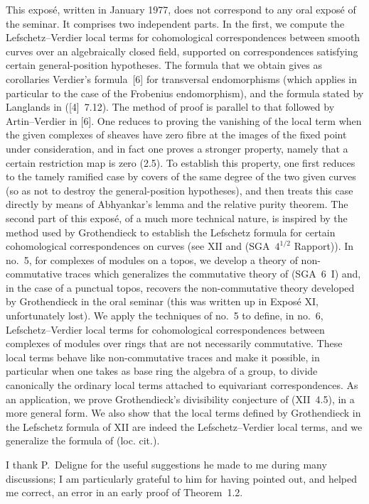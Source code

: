 This exposé, written in January 1977, does not correspond to any oral exposé of the seminar. It comprises two independent parts. In the first, we compute the Lefschetz--Verdier local terms for cohomological correspondences between smooth curves over an algebraically closed field, supported on correspondences satisfying certain general-position hypotheses. The formula that we obtain gives as corollaries Verdier's formula~[6] for transversal endomorphisms (which applies in particular to the case of the Frobenius endomorphism), and the formula stated by Langlands in ([4]~7.12). The method of proof is parallel to that followed by Artin--Verdier in [6]. One reduces to proving the vanishing of the local term when the given complexes of sheaves have zero fibre at the images of the fixed point under consideration, and in fact one proves a stronger property, namely that a certain restriction map is zero (2.5). To establish this property, one first reduces to the tamely ramified case by covers of the same degree of the two given curves (so as not to destroy the general-position hypotheses), and then treats this case directly by means of Abhyankar's lemma and the relative purity theorem. The second part of this exposé, of a much more technical nature, is inspired by the method used by Grothendieck to establish the Lefschetz formula for certain cohomological correspondences on curves (see XII and (SGA~$4^{1/2}$ Rapport)). In no.~5, for complexes of modules on a topos, we develop a theory of non-commutative traces which generalizes the commutative theory of (SGA~6~I) and, in the case of a punctual topos, recovers the non-commutative theory developed by Grothendieck in the oral seminar (this was written up in Exposé XI, unfortunately lost). We apply the techniques of no.~5 to define, in no.~6, Lefschetz--Verdier local terms for cohomological correspondences between complexes of modules over rings that are not necessarily commutative. These local terms behave like non-commutative traces and make it possible, in particular when one takes as base ring the algebra of a group, to divide canonically the ordinary local terms attached to equivariant correspondences. As an application, we prove Grothendieck's divisibility conjecture of (XII~4.5), in a more general form. We also show that the local terms defined by Grothendieck in the Lefschetz formula of XII are indeed the Lefschetz--Verdier local terms, and we generalize the formula of (loc. cit.).

I thank P.~Deligne for the useful suggestions he made to me during many discussions; I am particularly grateful to him for having pointed out, and helped me correct, an error in an early proof of Theorem~1.2.

